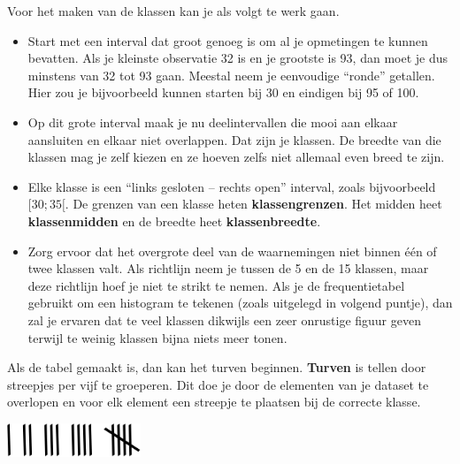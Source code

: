 \documentclass[12pt,twoside]{article}
\begin{document}
Voor het maken van de klassen kan je als volgt te werk gaan.
\begin{itemize}
  \item Start met een interval dat groot genoeg is om al je opmetingen te kunnen bevatten. Als je
kleinste observatie 32 is en je grootste is 93, dan moet je dus minstens van 32 tot 93 gaan.
Meestal neem je eenvoudige “ronde” getallen. Hier zou je bijvoorbeeld kunnen starten bij 30
en eindigen bij 95 of 100.
  \item Op dit grote interval maak je nu deelintervallen die mooi aan elkaar aansluiten en elkaar niet
overlappen. Dat zijn je klassen. De breedte van die klassen mag je zelf kiezen en ze hoeven
zelfs niet allemaal even breed te zijn.
  \item Elke klasse is een “links gesloten – rechts open” interval, zoals bijvoorbeeld $[30;35[$. De
grenzen van een klasse heten {\bf klassengrenzen}. Het midden heet {\bf klassenmidden} en de
breedte heet {\bf klassenbreedte}.
  \item Zorg ervoor dat het overgrote deel van de waarnemingen niet binnen één of twee klassen
valt. Als richtlijn neem je tussen de 5 en de 15 klassen, maar deze richtlijn hoef je niet te
strikt te nemen. Als je de frequentietabel gebruikt om een histogram te tekenen (zoals
uitgelegd in volgend puntje), dan zal je ervaren dat te veel klassen dikwijls een zeer onrustige
figuur geven terwijl te weinig klassen bijna niets meer tonen.
\end{itemize}

Als de tabel gemaakt is, dan kan het turven beginnen. {\bf Turven} is tellen door streepjes per vijf te groeperen. Dit doe je door de elementen van je dataset te overlopen en voor elk element een streepje te plaatsen bij de correcte klasse.

\begin{center}
\includegraphics[width=0.3\textwidth]{turven}
\end{center}
\end{document}
